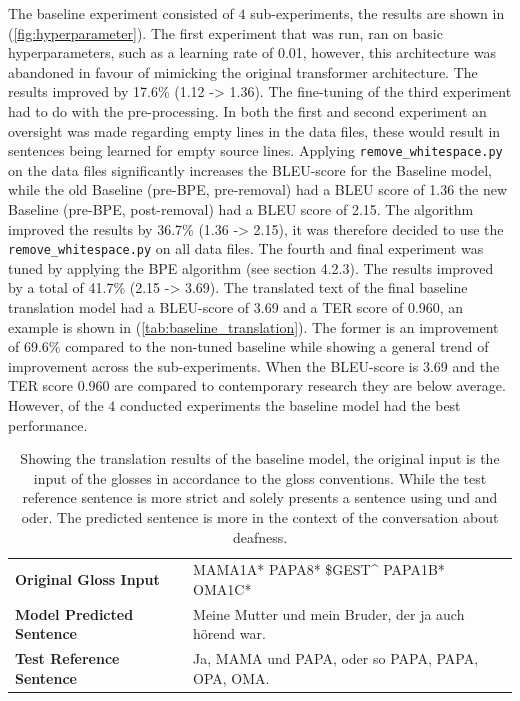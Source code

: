 The baseline experiment consisted of $4$ sub-experiments, the results are shown in (\autoref{fig:hyperparameter}). The first experiment that was run, ran on basic hyperparameters, such as a learning rate of 0.01, however, this architecture was abandoned in favour of mimicking the original transformer architecture. The results improved by 17.6\% (1.12 -> 1.36). The fine-tuning of the third experiment had to do with the pre-processing. In both the first and second experiment an oversight was made regarding empty lines in the data files, these would result in sentences being learned for empty source lines. Applying \texttt{remove\_whitespace.py} on the data files significantly increases the BLEU-score for the Baseline model, while the old Baseline (pre-BPE, pre-removal) had a BLEU score of 1.36 the new Baseline (pre-BPE, post-removal) had a BLEU score of 2.15. The algorithm improved the results by 36.7\% (1.36 -> 2.15), it was therefore decided to use the \texttt{remove\_whitespace.py} on all data files. The fourth and final experiment was tuned by applying the BPE algorithm \cite{gage1994new} (see section 4.2.3). The results improved by a total of 41.7\% (2.15 -> 3.69). The translated text of the final baseline translation model had a BLEU-score of 3.69 and a TER score of 0.960, an example is shown in (\autoref{tab:baseline_translation}). The former is an improvement of 69.6\% compared to the non-tuned baseline while showing a general trend of improvement across the sub-experiments. When the BLEU-score is 3.69 and the TER score 0.960 are compared to contemporary research they are below average.  However, of the $4$ conducted experiments the baseline model had the best performance.

\begin{table}[h]
\centering
\caption{Showing the translation results of the baseline model, the original input is the input of the glosses in accordance to the gloss conventions. While the test reference sentence is more strict and solely presents a sentence using und and oder. The predicted sentence is more in the context of the conversation about deafness. }

\begin{tabular}{ll}
\textbf{Original Gloss Input}     & MAMA1A* PAPA8* \$GEST\textasciicircum{} PAPA1B* OMA1C* \\
\textbf{Model Predicted Sentence} & Meine Mutter und mein Bruder, der ja auch hörend war.                                                                                     \\
\textbf{Test Reference Sentence}  & Ja, MAMA und PAPA, oder so PAPA, PAPA, OPA, OMA.                                                                                         
\end{tabular}
\bottomrule
\label{tab:baseline_translation}
\end{table}

